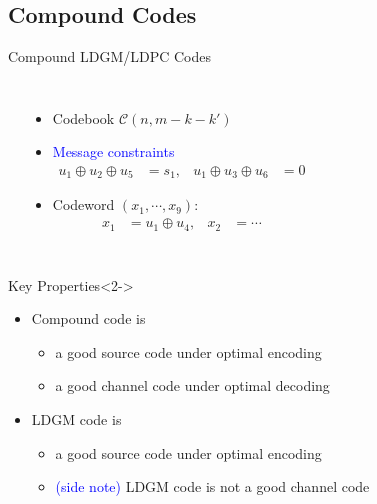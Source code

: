 \documentclass[10pt]{beamer}
\def\side_information_path{../compound-codes/isit14/slides/Figures}
\newlength\tikzwidth
\newlength\tikzheight
\begin{document}
\subsection{Compound Codes}
\begin{frame}{Compound LDGM/LDPC Codes}
  \begin{columns}
    \begin{center}
      \setlength\tikzheight{5cm}
      \setlength\tikzwidth{6cm}
      \scalebox{0.5}{}
    \end{center}
    \begin{itemize}
    \item Codebook $\mathcal{C}(n,m-k-k')$ \vspace{0.1cm}
    \item \textcolor{blue}{Message constraints} \vspace{-0.2cm}
      \begin{align*}
        u_1\oplus u_2 \oplus u_5&=s_1, &  u_1\oplus u_3 \oplus u_6&=0
      \end{align*}
    \item Codeword $(x_1,\cdots,x_9)$: \vspace{-0.2cm}
      \begin{align*}
        x_1 &= u_1 \oplus u_4, & x_2 &= \cdots
      \end{align*}
    \end{itemize}
  \end{columns}
  \vspace{0.2cm}
  \begin{block}{Key Properties}<2->
    \begin{itemize}
    \item Compound code is 
      \begin{itemize}
      \item a \alert{good source code} under optimal encoding
      \item a \alert{good channel code} under optimal decoding
      \end{itemize}
     \item LDGM code is 
       \begin{itemize}
       \item a \alert{good source code} under optimal encoding
       \item \textcolor{blue}{(side note)} LDGM code is \alert{not} a good channel code
       \end{itemize}
    \end{itemize}
  \end{block}
\end{frame}
\end{document}
